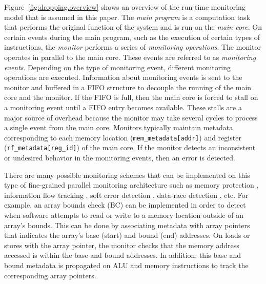 Figure~\ref{fig:dropping.overview} shows an overview of the run-time monitoring
model that is assumed in this paper.  The \emph{main program} is a computation
task that performs the original function of the system and is run on the
\emph{main core}.  On certain events during the main program, such as the
execution of certain types of instructions, the \emph{monitor} performs a
series of \emph{monitoring operations}. The monitor operates in parallel to the
main core. These events are referred to as \emph{monitoring events}. Depending
on the type of monitoring event, different monitoring operations are
executed. Information about monitoring events is sent to the monitor and
buffered in a FIFO structure to decouple the
running of the main core and the monitor. If the FIFO is full, then the main
core is forced to stall on a monitoring event until a FIFO entry becomes
available. These stalls are a major source of
overhead because the monitor may take several cycles to process a single event
from the main core. 
Monitors typically maintain metadata corresponding to each memory location
({\tt mem\_metadata[addr]}) and register ({\tt rf\_metadata[reg\_id]}) of the
main core.
If the monitor
detects an inconsistent or undesired behavior in the monitoring events, then
an error is detected. 

There are many possible monitoring schemes that can be implemented on this type
of fine-grained parallel monitoring architecture such as memory protection
\cite{mondrian-asplos02}, information flow tracking \cite{dift-asplos04,
testudo-micro08}, soft error detection \cite{argus-micro07}, data-race
detection \cite{cord-hpca06, eraser-tocs97}, etc.  For example, an array bounds check (BC)
\cite{hardbound-asplos08} can be implemented in order to detect
when software attempts to read or write to a memory location outside of an
array's bounds. This can be done by associating metadata with array pointers that 
indicates the array's base (start) and bound (end) addresses. On loads or stores with the
array
pointer, the monitor checks that the memory address accessed is within the base and
bound addresses. In addition, this base and bound metadata
is propagated on ALU and memory instructions to track the corresponding array pointers.

